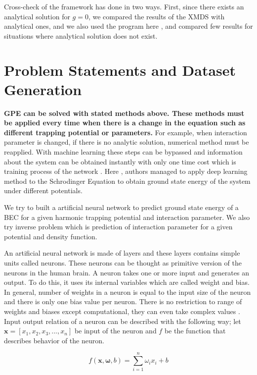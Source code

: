 \documentclass[a4paper,times,12pt]{article}
\begin{document}
Cross-check of the framework has done in two ways. First, since there exists an analytical solution for $g = 0$, we compared the results of the XMDS with analytical ones, and we also used the program here \cite{muruganandam2009fortran}, and compared few results for situations where analytical solution does not exist.  


\section{Problem Statements and Dataset Generation}

\textbf{GPE can be solved with stated methods above. These methods must be applied every time when there is a change in the equation such as different trapping potential or parameters.} For example, when interaction parameter is changed, if there is no analytic solution, numerical method must be reapplied. With machine learning these steps can be bypassed and information about the system can be obtained instantly with only one time cost which is training process of the network \cite{mills2017deep}. Here \cite{mills2017deep}, authors managed to apply deep learning method to the Schrodinger Equation to obtain ground state energy of the system under different potentials. 

We try to built a artificial neural network to predict ground state energy of a BEC for a given harmonic trapping potential and interaction parameter. We also try inverse problem which is prediction of interaction parameter for a given potential and density function. 

An artificial neural network is made of layers and these layers contains simple units called neurons. These neurons can be thought as primitive version of the neurons in the human brain. A neuron takes one or more input and generates an output. To do this, it uses its internal variables which are called weight and bias. In general, number of weights in a neuron is equal to the input size of the neuron and there is only one bias value per neuron. There is no restriction to range of weights and biases except computational, they can even take complex values \cite{zimmermann2011comparison}. Input output relation of a neuron can be described with the following way; let $\boldsymbol{x} = [x_1, x_2, x_3, ..., x_n]$ be input of the neuron and $f$ be the function that describes behavior of the neuron. 

\begin{equation}
\label{eq:NU_neuron}
f(\boldsymbol{x}, \boldsymbol{\omega}, b) = \sum\limits_{i = 1}^n \omega_i x_i + b
\end{equation}
\end{document}
